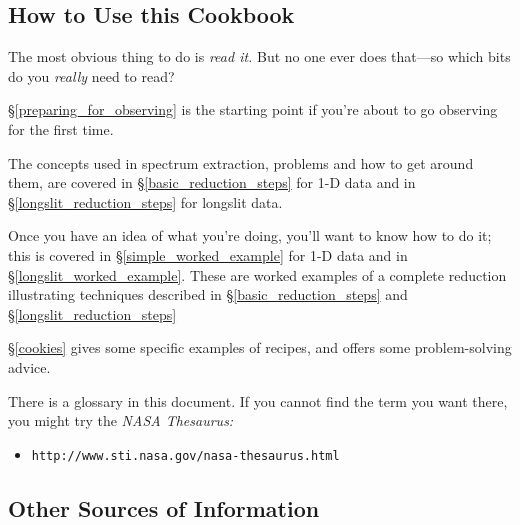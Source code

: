 \documentclass[twoside,11pt]{article}
\newcommand{\htmladdnormallink}[2]{#1}
\newcommand{\htmlref}[2]{#1}
\newcommand{\xlabel}[1]{}
\newcommand{\mlabel}[1]{\xlabel{#1}\label{#1}}
\newcommand{\scspec}[2]{#1}
\newcommand{\scspec}[2]{#2}
\begin{document}
\subsection{\mlabel{how_to_use}How to Use this Cookbook}

The most obvious thing to do is {\em read it.}  But no one ever
does that\scspec{---}{ - }so which bits do you {\em really} need to read?

\scspec{\S\ref{preparing_for_observing}}{\htmlref{Preparing for
Observing}{preparing_for_observing}} is the starting point if you're
about to go observing for the first time.

The concepts used in spectrum extraction, problems and how to get
around them, are covered in \scspec{\S\ref{basic_reduction_steps}}
{\htmlref{Basic Steps}{basic_reduction_steps}} for 1-D data and in
\scspec{\S\ref{longslit_reduction_steps}} {\htmlref{Longslit
reduction}{longslit_reduction_steps}} for longslit data. 

Once you have an idea of what you're doing, you'll want to know how to
do it; this is covered in \scspec{\S\ref{simple_worked_example}}
{\htmlref{A Worked Example}{simple_worked_example}} for 1-D data and
in \scspec{\S\ref{longslit_worked_example}} {\htmlref{A 2-D Worked
Example}{longslit_worked_example}}. These are worked examples of a
complete reduction illustrating techniques described in
\scspec{\S\ref{basic_reduction_steps}}{\htmlref{Basic Steps}
{basic_reduction_steps}} and \scspec{\S\ref{longslit_reduction_steps}}
{\htmlref{Longslit reduction}{longslit_reduction_steps}}

\scspec{\S\ref{cookies}}{The \htmlref{Cookies}{cookies} section} gives
some specific examples of recipes, and offers some problem-solving advice.

There is a \htmlref{glossary}{glossary} in this document.
If you cannot find the term you want there, you might try the
{\sl NASA Thesaurus:}

\begin{itemize}

\item \scspec{{\tt http://www.sti.nasa.gov/nasa-thesaurus.html}}
      {\htmladdnormallink{\verb+http://www.sti.nasa.gov/nasa-thesaurus.html+}
      {http://www.sti.nasa.gov/nasa-thesaurus.html}}

\end{itemize}


\subsection{\mlabel{other_sources}Other Sources of Information}
\end{document}
